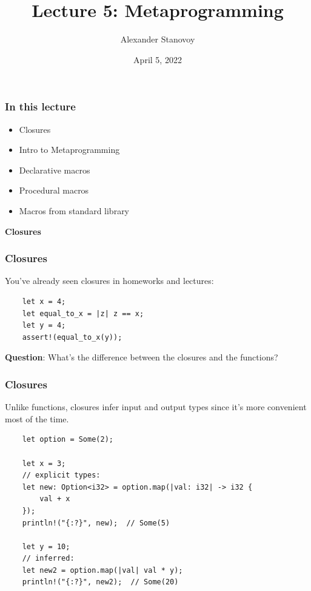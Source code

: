 \documentclass[aspectratio=1610,t]{beamer}
\title{Lecture 5: Metaprogramming}
\date{April 5, 2022}
\author{Alexander Stanovoy}
\institute{alex.stanovoy@gmail.com}
\begin{document}

\begin{frame}
\maketitle
\end{frame}


\begin{frame}[fragile]
\frametitle{In this lecture}
\begin{itemize}
    \item Closures
    \item Intro to Metaprogramming
    \item Declarative macros
    \item Procedural macros
    \item Macros from standard library
\end{itemize}
\end{frame}


\begin{frame}[c]
\centering\Huge\textbf{Closures}
\end{frame}


\begin{frame}[fragile]
\frametitle{Closures}
You've already seen closures in homeworks and lectures:

\begin{verbatim}
    let x = 4;
    let equal_to_x = |z| z == x;
    let y = 4;
    assert!(equal_to_x(y));
\end{verbatim}

\textbf{Question}: What's the difference between the closures and the functions?

\end{frame}


\begin{frame}[fragile]
\frametitle{Closures}
Unlike functions, closures infer input and output types since it's more convenient most of the time.

\begin{verbatim}
    let option = Some(2);

    let x = 3;
    // explicit types:
    let new: Option<i32> = option.map(|val: i32| -> i32 {
        val + x
    });
    println!("{:?}", new);  // Some(5)

    let y = 10;
    // inferred:
    let new2 = option.map(|val| val * y);
    println!("{:?}", new2);  // Some(20)
\end{verbatim}
\end{frame}
\end{document}
